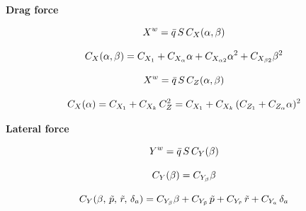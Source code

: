 
\textbf{Drag force}

\begin{equation}{\label{eqn:dragForceETHcraft}}
X^w = \bar{q} \, S \,  C_X(\alpha, \beta)
\end{equation}

\begin{equation}{\label{eqn:dragCoeffETHcraft}}
C_X(\alpha, \beta) = C_{X_1} + C_{X_{\alpha}} \alpha + C_{X_{\alpha 2}} {\alpha}^2 + C_{X_{\beta 2}} {\beta}^2 
\end{equation}

\begin{equation}{\label{eqn:dragForceMAKO}}
X^w = \bar{q} \, S \, C_{Z}(\alpha, \beta)
\end{equation}

\begin{equation}{\label{eqn:dragCoeffMAKO}}
C_X(\alpha) = C_{X_1} + C_{X_k} \, C_Z^2 = C_{X_1} + C_{X_k} \, (C_{Z_1} + C_{Z_{\alpha}} \alpha )^2
\end{equation}


\textbf{Lateral force}

\begin{equation}{\label{eqn:lateralForceETHcraft}}
Y^w = \bar{q} \, S \,  C_Y(\beta)
\end{equation}

\begin{equation}{\label{eqn:lateralCoeffETHcraft}}
C_Y(\beta) = C_{Y_\beta} \beta
\end{equation}

\begin{equation}{\label{eqn:lateralCoeffMAKO}}
C_Y(\beta, \, \tilde{p}, \, \tilde{r}, \, \delta_a) = C_{Y_\beta} \beta + C_{Y_{\tilde{p}}} \, \tilde{p} + C_{Y_{\tilde{r}}} \, \tilde{r} + C_{Y_a} \, \delta_a 
\end{equation}

